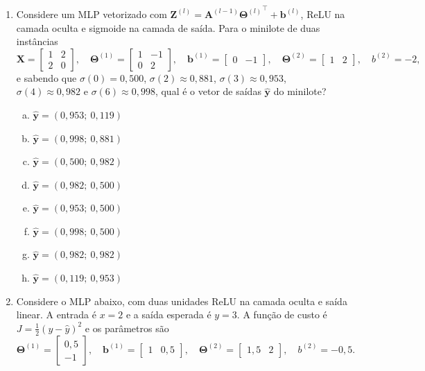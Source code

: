 \documentclass{dlproblemset}
\begin{document}
\begin{enumerate}[1)]
    \item Considere um MLP vetorizado com $\mathbf{Z}^{(l)} = \mathbf{A}^{(l-1)}{\mathbf{\Theta}^{(l)}}^{\top} + \mathbf{b}^{(l)}$, ReLU na camada oculta e sigmoide na camada de saída. Para o minilote de duas instâncias
    \[
    \mathbf{X} = \begin{bmatrix} 1 & 2 \\ 2 & 0 \end{bmatrix}, \quad
    \mathbf{\Theta}^{(1)} = \begin{bmatrix} 1 & -1 \\ 0 & 2 \end{bmatrix}, \quad
    \mathbf{b}^{(1)} = \begin{bmatrix} 0 & -1 \end{bmatrix}, \quad
    \mathbf{\Theta}^{(2)} = \begin{bmatrix} 1 & 2 \end{bmatrix}, \quad
    b^{(2)} = -2 ,
    \]
    e sabendo que $\sigma(0) = 0{,}500$, $\sigma(2) \approx 0{,}881$, $\sigma(3) \approx 0{,}953$, $\sigma(4) \approx 0{,}982$ e $\sigma(6) \approx 0{,}998$, qual é o vetor de saídas $\hat{\mathbf{y}}$ do minilote?

    \begin{enumerate}[(a)]
        \item $\hat{\mathbf{y}} = (0{,}953;\ 0{,}119)$
        \item $\hat{\mathbf{y}} = (0{,}998;\ 0{,}881)$
        \item $\hat{\mathbf{y}} = (0{,}500;\ 0{,}982)$
        \item $\hat{\mathbf{y}} = (0{,}982;\ 0{,}500)$
        \item $\hat{\mathbf{y}} = (0{,}953;\ 0{,}500)$
        \item $\hat{\mathbf{y}} = (0{,}998;\ 0{,}500)$
        \item $\hat{\mathbf{y}} = (0{,}982;\ 0{,}982)$
        \item $\hat{\mathbf{y}} = (0{,}119;\ 0{,}953)$
    \end{enumerate}

    \item Considere o MLP abaixo, com duas unidades ReLU na camada oculta e saída linear. A entrada é $x = 2$ e a saída esperada é $y = 3$. A função de custo é $J = \tfrac{1}{2}(y - \hat{y})^2$ e os parâmetros são
    \[
    \mathbf{\Theta}^{(1)} = \begin{bmatrix} 0{,}5 \\ -1 \end{bmatrix}, \quad
    \mathbf{b}^{(1)} = \begin{bmatrix} 1 & 0{,}5 \end{bmatrix}, \quad
    \mathbf{\Theta}^{(2)} = \begin{bmatrix} 1{,}5 & 2 \end{bmatrix}, \quad
    b^{(2)} = -0{,}5 .
    \]


\end{enumerate}
\end{document}
